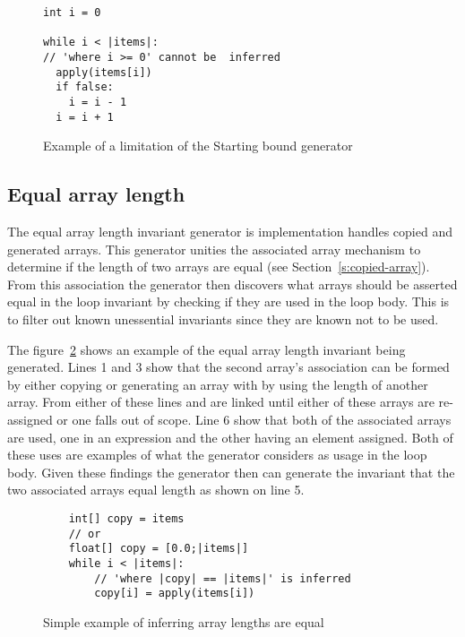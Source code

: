 \begin{figure}[ht]
\begin{lstlisting}
int i = 0

while i < |items|:
// 'where i >= 0' cannot be  inferred
  apply(items[i])
  if false:
    i = i - 1
  i = i + 1
\end{lstlisting}
\caption{Example of a limitation of the Starting bound generator}
\label{lst:whiley-start-limit}
\end{figure}

\subsection{Equal array length}


The equal array length invariant generator is implementation handles copied and
generated arrays.
This generator unities the associated array mechanism to determine if the
length of two arrays are equal (see Section~\ref{s:copied-array}).
From this association the generator then discovers what arrays should
be asserted equal in the loop invariant by checking if they are used in the
loop body.
This is to filter out known unessential invariants since they are known not to
be used.

The figure~\ref{lst:whiley-length} shows an example of the equal array length
invariant being generated.
Lines 1 and 3 show that the second array's association can be formed by either
copying or generating an array with by using the length of another array.
From either of these lines  and  are linked until
either of these arrays are re-assigned or one falls out of scope.
Line 6 show that both of the associated arrays are used, one in an expression
and the other having an element assigned.
Both of these uses are examples of what the generator considers as usage in
the loop body.
Given these findings the generator then can generate the invariant that
the two associated arrays equal length as shown on line 5.

\begin{figure}
\begin{lstlisting}
    int[] copy = items
    // or
    float[] copy = [0.0;|items|]
    while i < |items|:
        // 'where |copy| == |items|' is inferred
        copy[i] = apply(items[i])
\end{lstlisting}
\caption{Simple example of inferring array lengths are equal}
\label{lst:whiley-length}
\end{figure}

